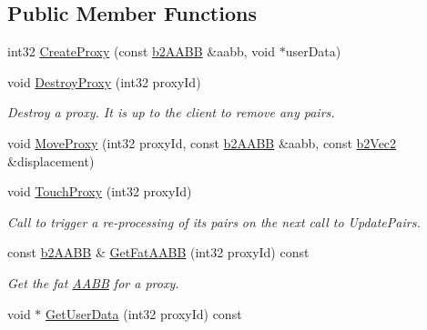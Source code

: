 \subsection*{Public Member Functions}
\begin{DoxyCompactItemize}
\item 
int32 \hyperlink{classb2BroadPhase_ae2f7af756bc55ece45221466c5af449c}{Create\+Proxy} (const \hyperlink{structb2AABB}{b2\+A\+A\+BB} \&aabb, void $\ast$user\+Data)
\item 
\mbox{\label{classb2BroadPhase_a84f0fb227dc01a9b9baa55c7b8c68984}} 
void \hyperlink{classb2BroadPhase_a84f0fb227dc01a9b9baa55c7b8c68984}{Destroy\+Proxy} (int32 proxy\+Id)
\begin{DoxyCompactList}\small\item\em Destroy a proxy. It is up to the client to remove any pairs. \end{DoxyCompactList}\item 
void \hyperlink{classb2BroadPhase_a01dc18a19c2b5d0cc1d9cd8c8554234c}{Move\+Proxy} (int32 proxy\+Id, const \hyperlink{structb2AABB}{b2\+A\+A\+BB} \&aabb, const \hyperlink{structb2Vec2}{b2\+Vec2} \&displacement)
\item 
\mbox{\label{classb2BroadPhase_a67b296431ebbc7b44037f21d645d9166}} 
void \hyperlink{classb2BroadPhase_a67b296431ebbc7b44037f21d645d9166}{Touch\+Proxy} (int32 proxy\+Id)
\begin{DoxyCompactList}\small\item\em Call to trigger a re-\/processing of it\textquotesingle{}s pairs on the next call to Update\+Pairs. \end{DoxyCompactList}\item 
\mbox{\label{classb2BroadPhase_af5c47c036ca67d44676ea3cec73ae3d8}} 
const \hyperlink{structb2AABB}{b2\+A\+A\+BB} \& \hyperlink{classb2BroadPhase_af5c47c036ca67d44676ea3cec73ae3d8}{Get\+Fat\+A\+A\+BB} (int32 proxy\+Id) const
\begin{DoxyCompactList}\small\item\em Get the fat \hyperlink{classAABB}{A\+A\+BB} for a proxy. \end{DoxyCompactList}\item 
\mbox{\label{classb2BroadPhase_a3b85893e3cf18b43087cb96b0b9076d1}} 
void $\ast$ \hyperlink{classb2BroadPhase_a3b85893e3cf18b43087cb96b0b9076d1}{Get\+User\+Data} (int32 proxy\+Id) const

\end{DoxyCompactItemize}
